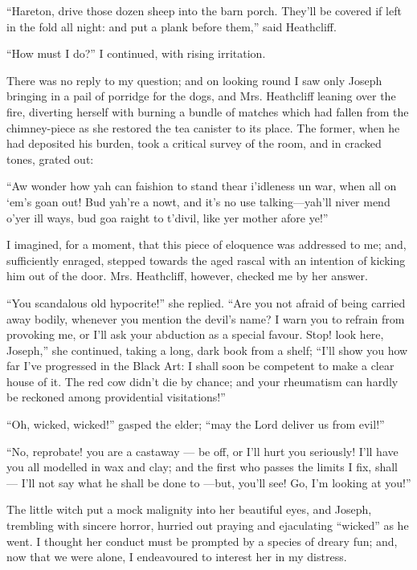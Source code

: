 \par “Hareton, drive those dozen sheep into the barn porch. They'll be covered if left in the fold all night: and put a plank before them,” said Heathcliff.
\par “How must I do?” I continued, with rising irritation.
\par There was no reply to my question; and on looking round I saw only Joseph bringing in a pail of porridge for the dogs, and Mrs. Heathcliff leaning over the fire, diverting herself with burning a bundle of matches which had fallen from the chimney-piece as she restored the tea canister to its place. The former, when he had deposited his burden, took a critical survey of the room, and in cracked tones, grated out:
\par “Aw wonder how yah can faishion to stand thear i'idleness un war, when all on ‘em's goan out! Bud yah're a nowt, and it's no use talking—yah'll niver mend o'yer ill ways, bud goa raight to t'divil, like yer mother afore ye!”
\par I imagined, for a moment, that this piece of eloquence was addressed to me; and, sufficiently enraged, stepped towards the aged rascal with an intention of kicking him out of the door. Mrs. Heathcliff, however, checked me by her answer.
\par “You scandalous old hypocrite!” she replied. “Are you not afraid of being carried away bodily, whenever you mention the devil's name? I warn you to refrain from provoking me, or I'll ask your abduction as a special favour. Stop! look here, Joseph,” she continued, taking a long, dark book from a shelf; “I'll show you how far I've progressed in the Black Art: I shall soon be competent to make a clear house of it. The red cow didn't die by chance; and your rheumatism can hardly be reckoned among providential visitations!”
\par “Oh, wicked, wicked!” gasped the elder; “may the Lord deliver us from evil!”
\par “No, reprobate! you are a castaway — be off, or I'll hurt you seriously! I'll have you all modelled in wax and clay; and the first who passes the limits I fix, shall — I'll not say what he shall be done to —but, you'll see! Go, I'm looking at you!”
\par The little witch put a mock malignity into her beautiful eyes, and Joseph, trembling with sincere horror, hurried out praying and ejaculating “wicked” as he went. I thought her conduct must be prompted by a species of dreary fun; and, now that we were alone, I endeavoured to interest her in my distress.
